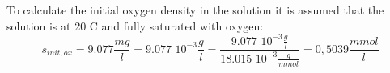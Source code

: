 \documentclass[a4paper,10pt]{article}
\begin{document}
To calculate the initial oxygen density in the solution it is assumed that the solution is at 20 \textdegree C and fully saturated
with oxygen:
\begin{equation} \label{eq:init_oxygen_density}
s_{init,ox} = 9.077 \frac{mg}{l} = 9.077 \,\, 10^{-3}  \frac{g}{l} = \frac{9.077 \,\, 10^{-3} \frac{g}{l}}{18.015 \,\, 10^{-3} \frac{g}{mmol}} = 0,5039 \frac{mmol}{l} 
\end{equation}

\newpage

\printbibliography
\end{document}
